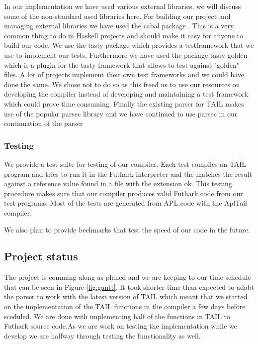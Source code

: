 \documentclass[11pt]{article}
\begin{document}
In our implementation we have used various external libraries, we will discuss some of the non-standard used libraries here.
For building our project and managing external libraries we have used the cabal package \cite{cabal}. This is a very common thing to
do in Haskell projects and should make it easy for anyone to build our code.
We use the tasty package \cite{tasty} which provides a testframework that we use to implement our tests. Furthermore we have used the
package tasty-golden \cite{tasty-golden} which is a plugin for the tasty framework that allows to test against "golden" files.
A lot of projects implement their own test frameworks and we could have done the same.
We chose not to do so as this freed us to use our resources on developing the compiler instead of developing and maintaining a
test framework which could prove time consuming.
Finally the existing parser for TAIL makes use of the popular parsec library \cite{parsec} and we have continued to use parsec in our continuation
of the parser

\subsubsection{Testing}

We provide a test suite for testing of our compiler.
Each test compiles an TAIL program and tries to run it in the Futhark interpreter and the matches the result against a reference value found in a file with the extension ok.
This testing procedure makes sure that our compiler produces valid Futhark code from our test programs.
Most of the tests are generated from APL code with the AplTail compiler.

We also plan to provide bechmarks that test the speed of our code in the future.

\subsection{Project status}
The project is comming along as planed and we are keeping to our time schedule that can be seen in Figure \ref{fig:gantt}.
It took shorter time than expected to adabt the parser to work with the latest version of TAIL
which meant that we started on the implementation of the TAIL functions in the compiler a few days before sceduled. 
We are done with implementing half of the functions in TAIL to Futhark source code.As we are work on testing the
implementation while we develop we are halfway through testing the functionality as well. 
\end{document}

